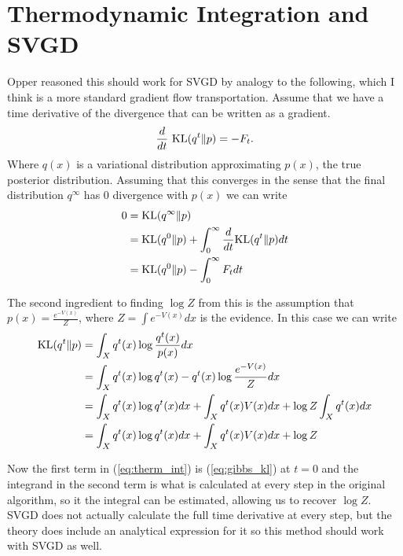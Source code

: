 \documentclass{article}
\begin{document}
\section{Thermodynamic Integration and SVGD}
    Opper reasoned this should work for SVGD by analogy to the following, which I think is a more standard gradient
    flow transportation. Assume that we have a time derivative of the \KL divergence that can be written as a gradient.
    \begin{equation}
        \frac{d}{dt}\ \textrm{KL}( q^t \| p ) = - F_t.
    \end{equation}
    Where $q(x)$ is a variational distribution approximating $p(x)$, the true posterior distribution.
    Assuming that this converges in the sense that the final distribution $q^{\infty}$ has 0 \KL divergence with 
    $p(x)$ we can write
    \begin{align}
    \label{eq:therm_int}
    0 &= \text{\textrm{KL}}( q^{\infty} \| p ) \\
    &= \text{\textrm{KL}} ( q^0 \| p ) + \int_0^{\infty} \frac{d}{dt} \text{\textrm{KL}} ( q^t \| p ) dt \\
    &= \text{\textrm{KL}}( q^0 \| p ) - \int_0^{\infty} F_t dt
    \end{align}

    The second ingredient to finding $\log Z$ from this is the assumption that $p(x) = \frac{ e^{-V(x)} }{ Z }$, 
    where $Z = \int e^{-V(x)} dx$ is the evidence. In this case we can write
    \begin{align}
    \label{eq:gibbs_kl}
        \text{\textrm{KL}}( q^t \| p ) &= \int_X q^t(x) \log \frac{ q^t(x) }{ p(x) } dx \\
                        &= \int_X q^t(x) \log q^t(x) - q^t(x) \log \frac{ e^{-V(x)} }{ Z } dx \\
                        &= \int_X q^t(x) \log q^t(x) dx + \int_X q^t(x) V(x) dx + \log Z \int_X q^t(x) dx \\
                        &= \int_X q^t(x) \log q^t(x) dx + \int_X q^t(x) V(x) dx + \log Z
    \end{align}

    Now the first term in (\ref{eq:therm_int}) is (\ref{eq:gibbs_kl}) at $t=0$ and the integrand in the second term is
    what is calculated at every step in the original algorithm, so it the integral can be estimated, allowing us to 
    recover $\log Z$. SVGD does not actually calculate the full time derivative at every step, but the theory does 
    include an analytical expression for it so this method should work with SVGD as well.
\end{document}
